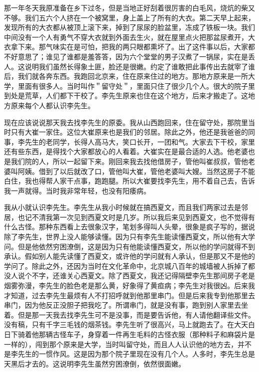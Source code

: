 那一年冬天我原准备在乡下过冬，但是当地正好刮着很厉害的白毛风，烧炕的柴又不够。我们五六个人挤在一个被窝里，身上盖上了所有的大衣。第二天早上起来，发现所有的大衣都从被顶上滚下来，掉到了尿尿的脸盆里，冻成了铁板一块。我们中间没有一个人有勇气不穿大衣就到外面去生火，就在屋里点火把那盆尿煮开，大衣拿下来。那气味实在是可怕，把我的两只眼都熏坏了。出了这件事以后，大家都不好意思了；谁见了谁都是羞答答，因为六个堂堂的男子汉煮了一锅尿，实在是丢人。这说明我们虽然长得象土匪，脸还是很嫩。约定了谁敢把此事传出去就宰了谁后，我们就各奔东西。我跑回北京来，住在原来住过的地方。那地方原来是一所大学，里面有很多人。当时叫作＂留守处＂，里面只住了很少几个人。很大的院子里到处是荒草，人们都下干校了。李先生原来也住在这个地方，后来才搬走了。这地方原来每个人都认识李先生。 

现在应该说说那天我去找李先生的原委。我从山西跑回来，住在留守处，那院里当时只有大崔一家住。这位大崔原来也是我们的邻居。除此之外，他还是我爸爸的同事，李先生的老同学，长得人高马大，笑口长开，一团和气。大家去下干校，家里还有些东西，是得找个大家都放心的人看着。大崔实在是最合适的人选。他老婆也是我们院的人，所以一起留下来。刚回来我去找他借房子，管他叫崔叔叔，管他老婆叫阿姨。借到了以后就改了口，管他叫大崔，管他老婆叫大嫂。当然这房子不能白住，我也得帮人家干点事，跑跑腿。所以大崔要找李先生，用不着自己去，告诉我一声就得。当时我非常年轻，也没有阳痿病。 

我从小就认识李先生。李先生从我小时候就在搞西夏文，而且我们两家过去是邻居，也记不清我第一次见到西夏文时是几岁。所以我后来见到西夏文，也不觉得有什么古怪。那种东西看上去很象汉字，笔划多得叫人头晕，很象是疯子写的，据说除了李先生，世界上没人能够读懂。因为只有李先生能读懂西夏文，所以他有大学问。但是他依然穷困潦倒，这是因为只有他能读懂西夏文，所以他的学问就得不到承认。假如别人能先读懂了西夏文，或许他的学问就有人承认，但是那又不是他的学问了。除此之外，还因为当时在文化革命中，北京城八百年的城墙被人拆掉了都没人说个不字，还谁关心西夏文。除了西夏文，我还记得隔壁李先生那间房子老是烟雾弥漫，李先生的脸色老是那么黄，好象得了黄疸病；李先生对我很凶。后来我才知道，过去李先生最烦有人不打招呼就到他那里串门。但是后来我专到他那里去串门，因为他反正没胆子把我吃了。所谓串门，就是没有事，跑到别人家里去坐着。但是那一天我去找李先生可不是没事，而是要告诉他，有人请他翻译些文件。没有稿，只有千字三毛钱的烟茶钱。李先生听了很高兴，马上就跑去了。在大天白日下骑着他那辆古怪车子，身穿着一件再生毛料的古怪衣服（那种料子和麻袋片是一样的），闯到那个原来是大学，当时叫留守处，而且人人认识他的地方去，并不是李先生的一惯作风。这是因为那个院子里现在没有几个人。人多时，李先生总是天黑后才去的。这说明李先生虽然穷困潦倒，依然很面嫩。 

